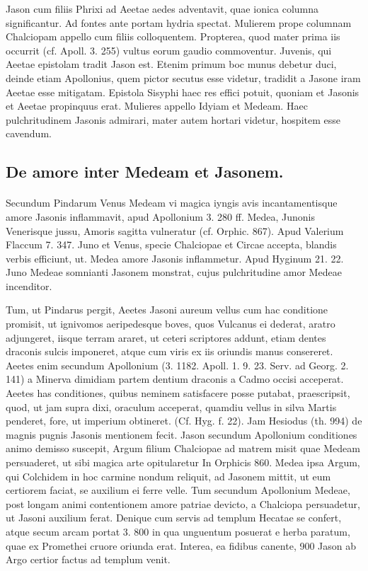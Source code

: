 \documentclass[landscape, a4paper, 11pt, oneside, polutonikogreek, german]{article}
\begin{document}
Jason cum filiis Phrixi ad Aeetae aedes adventavit, quae ionica columna significantur. Ad fontes ante portam hydria spectat. Mulierem prope columnam Chalciopam appello cum filiis colloquentem. Propterea, quod mater prima iis occurrit (cf. Apoll. 3. 255) vultus eorum gaudio commoventur. Juvenis, qui Aeetae epistolam tradit Jason est. Etenim primum boc munus debetur duci, deinde etiam Apollonius, quem pictor secutus esse videtur, tradidit a Jasone iram Aeetae esse mitigatam. Epistola Sisyphi haec res effici potuit, quoniam et Jasonis et Aeetae propinquus erat. Mulieres appello Idyiam et Medeam. Haec pulchritudinem Jasonis admirari, mater autem hortari videtur, hospitem esse cavendum.

\subsection{De amore inter Medeam et Jasonem.}
\paragraph{}
Secundum Pindarum Venus Medeam vi magica iyngis avis incantamentisque amore Jasonis inflammavit, apud Apollonium 3. 280 ff. Medea, Junonis Venerisque jussu, Amoris sagitta vulneratur (cf. Orphic. 867). Apud Valerium Flaccum 7. 347. Juno et Venus, specie Chalciopae et Circae accepta, blandis verbis efficiunt, ut. Medea amore Jasonis inflammetur. Apud Hyginum 21. 22. Juno Medeae somnianti Jasonem monstrat, cujus pulchritudine amor Medeae incenditor.

Tum, ut Pindarus pergit, Aeetes Jasoni aureum vellus cum hac conditione promisit, ut ignivomos aeripedesque boves, quos Vulcanus ei dederat, aratro adjungeret, iisque terram araret, ut ceteri scriptores addunt, etiam dentes draconis sulcis imponeret, atque cum viris ex iis oriundis manus consereret. Aeetes enim secundum Apollonium (3. 1182. Apoll. 1. 9. 23. Serv. ad Georg. 2. 141) a Minerva dimidiam partem dentium draconis a Cadmo occisi acceperat. Aeetes has conditiones, quibus neminem satisfacere posse putabat, praescripsit, quod, ut jam supra dixi, oraculum acceperat, quamdiu vellus in silva Martis penderet, fore, ut imperium obtineret. (Cf. Hyg. f. 22). Jam Hesiodus (th. 994) de magnis pugnis Jasonis mentionem fecit. Jason secundum Apollonium conditiones animo demisso suscepit, Argum filium Chalciopae ad matrem misit quae Medeam persuaderet, ut sibi magica arte opitularetur In Orphicis 860. Medea ipsa Argum, qui Colchidem in hoc carmine nondum reliquit, ad Jasonem mittit, ut eum certiorem faciat, se auxilium ei ferre velle. Tum secundum Apollonium Medeae, post longam animi contentionem amore patriae devicto, a Chalciopa persuadetur, ut Jasoni auxilium ferat. Denique cum servis ad templum Hecatae se confert, atque secum arcam portat 3. 800 in qua unguentum posuerat e herba paratum, quae ex Promethei cruore oriunda erat. Interea, ea fidibus canente, 900 Jason ab Argo certior factus ad templum venit.
\end{document}
